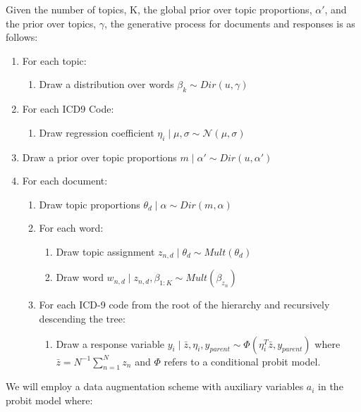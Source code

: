 \documentclass{article}
\begin{document}
Given the number of topics, K, the global prior over topic proportions,
$\alpha'$, and the prior over topics, $\gamma$, the generative process
for documents and responses is as follows: 
\begin{enumerate}
\item For each topic:

\begin{enumerate}
\item Draw a distribution over words $\beta_{k}\sim Dir\left(u,\gamma\right)$
\end{enumerate}
\item For each ICD9 Code:

\begin{enumerate}
\item Draw regression coefficient $\eta_{i}\mid\mu,\sigma\sim\mathcal{N}\left(\mu,\sigma\right)$ 
\end{enumerate}
\item Draw a prior over topic proportions $m\mid\alpha'\sim Dir\left(u,\alpha'\right)$ 
\item For each document:

\begin{enumerate}
\item Draw topic proportions $\theta_{d}\mid\alpha\sim Dir\left(m,\alpha\right)$ 
\item For each word:

\begin{enumerate}
\item Draw topic assignment $z_{n,d}\mid\theta_{d}\sim Mult\left(\theta_{d}\right)$ 
\item Draw word $w_{n,d}\mid z_{n,d},\beta_{1:K}\sim Mult\left(\beta_{z_{n}}\right)$ 
\end{enumerate}
\item For each ICD-9 code from the root of the hierarchy and recursively
descending the tree:

\begin{enumerate}
\item Draw a response variable $y_{i}\mid\bar{z},\eta_{i},y_{parent}\sim\Phi(\eta_{i}^{T}\bar{z},y_{parent})$
where $\bar{z}=N^{-1}\sum_{n=1}^{N}z_{n}$ and $\Phi$ refers to a
conditional probit model.
\end{enumerate}
\end{enumerate}
\end{enumerate}
We will employ a data augmentation scheme with auxiliary variables
$a_{i}$ in the probit model where:
\end{document}
